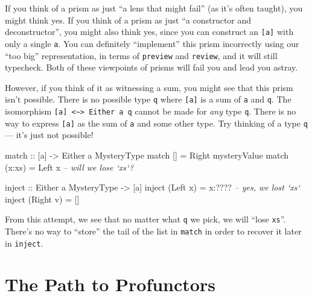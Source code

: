 \documentclass[]{article}
\newenvironment{Shaded}{}{}
\newcommand{\CommentTok}[1]{\textcolor[rgb]{0.38,0.63,0.69}{\textit{#1}}}
\newcommand{\DataTypeTok}[1]{\textcolor[rgb]{0.56,0.13,0.00}{#1}}
\newcommand{\FunctionTok}[1]{\textcolor[rgb]{0.02,0.16,0.49}{#1}}
\newcommand{\NormalTok}[1]{#1}
\newcommand{\OtherTok}[1]{\textcolor[rgb]{0.00,0.44,0.13}{#1}}
\begin{document}
If you think of a prism as just ``a lens that might fail'' (as it's often
taught), you might think yes. If you think of a prism as just ``a constructor
and deconstructor'', you might also think yes, since you can construct an
\texttt{{[}a{]}} with only a single \texttt{a}. You can definitely ``implement''
this prism incorrectly using our ``too big'' representation, in terms of
\texttt{preview} and \texttt{review}, and it will still typecheck. Both of these
viewpoints of prisms will fail you and lead you astray.

However, if you think of it as witnessing a sum, you might see that this prism
isn't possible. There is no possible type \texttt{q} where \texttt{{[}a{]}} is a
sum of \texttt{a} and \texttt{q}. The isomorphism
\texttt{{[}a{]}\ \textless{}\textasciitilde{}\textgreater{}\ Either\ a\ q}
cannot be made for \emph{any} type \texttt{q}. There is no way to express
\texttt{{[}a{]}} as the sum of \texttt{a} and some other type. Try thinking of a
type \texttt{q} --- it's just not possible!

\begin{Shaded}
\begin{Highlighting}[]
\OtherTok{match ::}\NormalTok{ [a] }\OtherTok{->} \DataTypeTok{Either}\NormalTok{ a }\DataTypeTok{MysteryType}
\NormalTok{match []     }\FunctionTok{=} \DataTypeTok{Right}\NormalTok{ mysteryValue}
\NormalTok{match (x}\FunctionTok{:}\NormalTok{xs) }\FunctionTok{=} \DataTypeTok{Left}\NormalTok{ x                       }\CommentTok{-- will we lose `xs`?}

\OtherTok{inject ::} \DataTypeTok{Either}\NormalTok{ a }\DataTypeTok{MysteryType} \OtherTok{->}\NormalTok{ [a]}
\NormalTok{inject (}\DataTypeTok{Left}\NormalTok{ x)  }\FunctionTok{=}\NormalTok{ x}\FunctionTok{:????}                   \CommentTok{-- yes, we lost `xs`}
\NormalTok{inject (}\DataTypeTok{Right}\NormalTok{ v) }\FunctionTok{=}\NormalTok{ []}
\end{Highlighting}
\end{Shaded}

From this attempt, we see that no matter what \texttt{q} we pick, we will ``lose
\texttt{xs}''. There's no way to ``store'' the tail of the list in
\texttt{match} in order to recover it later in \texttt{inject}.

\hypertarget{the-path-to-profunctors}{%
\section{The Path to Profunctors}\label{the-path-to-profunctors}}
\end{document}
